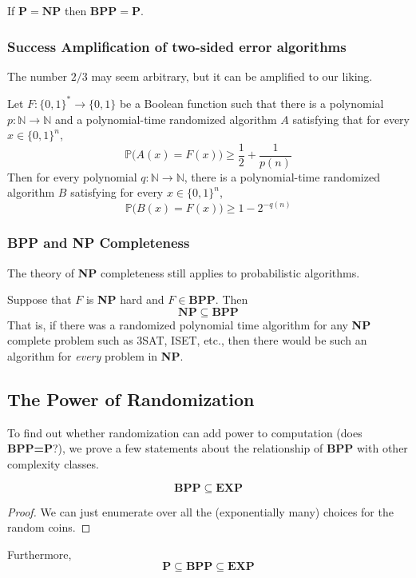 \documentclass{article}
\begin{document}
  \begin{theorem}
  If $\mathbf{P = NP}$ then $\mathbf{BPP = P}$. 
  \end{theorem}

  \subsubsection{Success Amplification of two-sided error algorithms}
  The number $2/3$ may seem arbitrary, but it can be amplified to our liking.

  \begin{theorem}[Amplification]
  Let $F: \{0, 1\}^* \longrightarrow \{0, 1\}$ be a Boolean function such that there is a polynomial $p: \mathbb{N} \longrightarrow \mathbb{N}$ and a polynomial-time randomized algorithm $A$ satisfying that for every $x \in \{0, 1\}^n$, 
  \[\mathbb{P} \big( A(x) = F(x) \big) \geq \frac{1}{2} + \frac{1}{p(n)}\]
  Then for every polynomial $q: \mathbb{N} \longrightarrow \mathbb{N}$, there is a polynomial-time randomized algorithm $B$ satisfying for every $x \in \{0, 1\}^n$,
  \[\mathbb{P} \big( B(x) = F(x)\big) \geq 1 - 2^{-q(n)}\]
  \end{theorem}

  \subsubsection{BPP and NP Completeness}
  The theory of \textbf{NP} completeness still applies to probabilistic algorithms. 

  \begin{theorem}
  Suppose that $F$ is \textbf{NP} hard and $F \in \mathbf{BPP}$. Then 
  \[\mathbf{NP \subseteq BPP}\]
  That is, if there was a randomized polynomial time algorithm for any \textbf{NP} complete problem such as 3SAT, ISET, etc., then there would be such an algorithm for \textit{every} problem in \textbf{NP}. 
  \end{theorem}

  \subsection{The Power of Randomization}
  To find out whether randomization can add power to computation (does \textbf{BPP=P}?), we prove a few statements about the relationship of \textbf{BPP} with other complexity classes. 

  \begin{theorem}
  \[\mathbf{BPP \subseteq EXP}\]
  \end{theorem}
  \begin{proof}
  We can just enumerate over all the (exponentially many) choices for the random coins. 
  \end{proof}

  Furthermore, 
  \[\mathbf{P \subseteq BPP \subseteq EXP}\]
\end{document}
